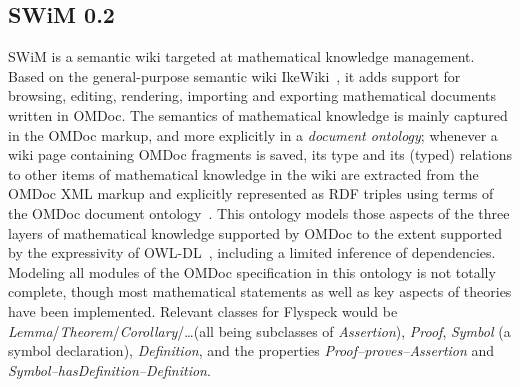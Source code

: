 \subsection{SWiM 0.2}
\label{sec:swim}

\begin{background}
SWiM is a semantic wiki targeted at mathematical knowledge management.  Based on
the general-purpose semantic wiki IkeWiki~\cite{KrSchVr:semwiki-reasoning07}, it
adds support for browsing, editing, rendering, importing and exporting
mathematical documents written in OMDoc.  The semantics of mathematical
knowledge is mainly captured in the OMDoc markup, and more explicitly in a
\emph{document ontology}; whenever a wiki page containing OMDoc fragments is
saved, its type and its (typed) relations to other items of mathematical
knowledge in the wiki are extracted from the OMDoc XML markup and explicitly
represented as RDF triples using terms of the OMDoc document
ontology~\cite{OMDocDocOnto:web}.  This ontology models those aspects of the
three layers of mathematical knowledge supported by OMDoc to the extent
supported by the expressivity of OWL-DL~\cite{McGvHa:owl04}, including a limited
inference of dependencies.  Modeling all modules of the OMDoc specification in
this ontology is not totally complete, though most mathematical statements as
well as key aspects of theories have been implemented.  Relevant classes for
Flyspeck would be \textit{Lemma}/\textit{Theorem}/\textit{Corollary}/\ldots (all
being subclasses of \textit{Assertion}), \textit{Proof}, \textit{Symbol} (a
symbol declaration), \textit{Definition}, and the properties
\textit{Proof--proves--Assertion} and
\textit{Symbol--hasDefinition--Definition}.

\begin{figure}
  \centering
  \vspace{-.5cm}
\end{figure}
\end{background}
